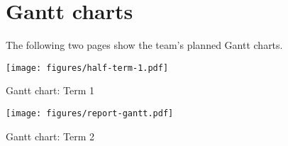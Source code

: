 \chapter{Gantt charts}\label{ch:gantt}

The following two pages show the team's planned Gantt charts.

\begin{landscape}

\begin{table}
    \texttt{[image: figures/half-term-1.pdf]}
    \caption{Gantt chart: Term 1}
    \label{table:gantt:term11}
\end{table}

\begin{table}[h!]
    \texttt{[image: figures/report-gantt.pdf]}
    \caption{Gantt chart: Term 2}
    \label{table:gantt:report}
\end{table}

\end{landscape}